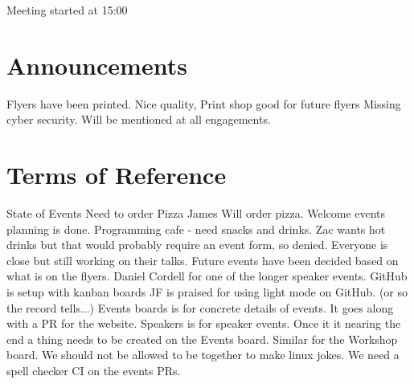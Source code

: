 \documentclass[11pt,hacksoc]{meetingmins}
\begin{document}
\maketitle

\begin{items}
  \item {Meeting started at 15:00}
\end{items}

\section{Announcements}
\begin{items}
  \item {Flyers have been printed. Nice quality, Print shop good for future flyers}
  \subitem Missing cyber security. Will be mentioned at all engagements.
\end{items}


\section{Terms of Reference}
\begin{items}
  \item {State of Events}
  \subitem Need to order Pizza
  \subitem James Will order pizza.
  \subitem Welcome events planning is done.
  \subitem Programming cafe - need snacks and drinks. Zac wants hot drinks but that would probably require an event form, so denied.
  \subitem Everyone is close but still working on their talks.
  \subitem Future events have been decided based on what is on the flyers.
  \subitem Daniel Cordell for one of the longer speaker events.
  \subitem GitHub is setup with kanban boards
  \subitem JF is praised for using light mode on GitHub. (or so the record tells...)
  \subitem Events boards is for concrete details of events. It goes along with a PR for the website.
  \subitem Speakers is for speaker events. Once it it nearing the end a thing needs to be created on the Events board.
  \subitem Similar for the Workshop board.
  \subitem We should not be allowed to be together to make linux jokes.
  \subitem We need a spell checker CI on the events PRs.
\end{items}

\end{document}
